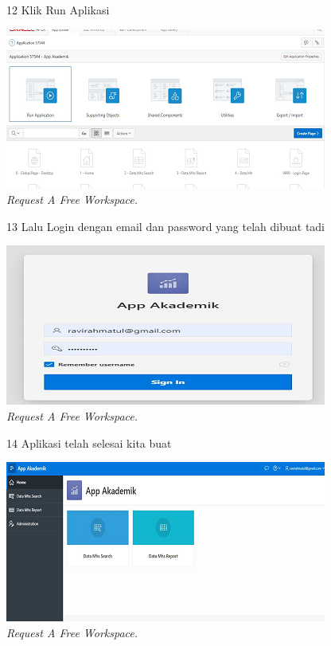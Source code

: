 \begin{enumerate}
\begin{figure}[!htbp]
\item[12]Klik Run Aplikasi

    \begin{center}
    \includegraphics[scale=0.5]{figures/12.png}
    \caption{\textit{Request A Free Workspace.}}
    \end{center}
    \end{figure}

\begin{figure}[!htbp]
\item[13]Lalu Login dengan email dan password yang telah dibuat tadi

    \begin{center}
    \includegraphics[scale=0.5]{figures/13.png}
    \caption{\textit{Request A Free Workspace.}}
    \end{center}
    \end{figure}

\begin{figure}[!htbp]
\item[14]Aplikasi telah selesai kita buat

    \begin{center}
    \includegraphics[scale=0.5]{figures/14.png}
    \caption{\textit{Request A Free Workspace.}}
    \end{center}
    \end{figure}
    

\end{enumerate}
